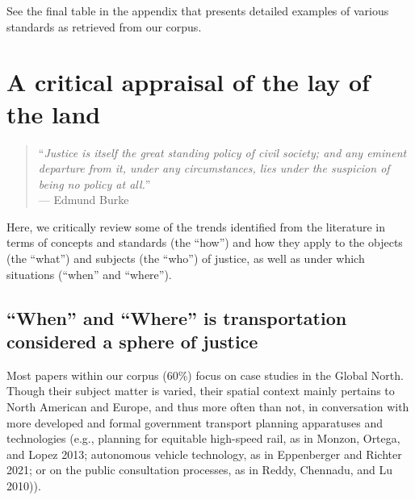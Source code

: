 \documentclass[12pt, oneside]{report}
\begin{document}
See the final table in the appendix that presents detailed examples of
various standards as retrieved from our corpus.

\hypertarget{sect5}{%
\section{A critical appraisal of the lay of the land}\label{sect5}}

\begin{quote}
``\emph{Justice is itself the great standing policy of civil society;
and any eminent departure from it, under any circumstances, lies under
the suspicion of being no policy at all.}''\\
--- Edmund Burke
\end{quote}

Here, we critically review some of the trends identified from the
literature in terms of concepts and standards (the ``how'') and how they
apply to the objects (the ``what'') and subjects (the ``who'') of
justice, as well as under which situations (``when'' and ``where'').

\hypertarget{when-and-where-is-transportation-considered-a-sphere-of-justice}{%
\subsection{``When'' and ``Where'' is transportation considered a sphere
of
justice}\label{when-and-where-is-transportation-considered-a-sphere-of-justice}}

Most papers within our corpus (60\%) focus on case studies in the Global
North. Though their subject matter is varied, their spatial context
mainly pertains to North American and Europe, and thus more often than
not, in conversation with more developed and formal government transport
planning apparatuses and technologies (e.g., planning for equitable
high-speed rail, as in Monzon, Ortega, and Lopez 2013; autonomous
vehicle technology, as in Eppenberger and Richter 2021; or on the public
consultation processes, as in Reddy, Chennadu, and Lu 2010)).
\end{document}
